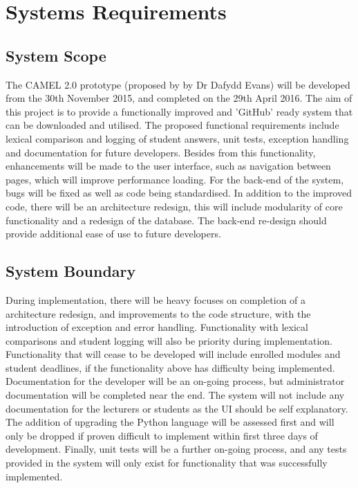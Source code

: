 \section{Systems Requirements}
    \subsection*{System Scope}
	The CAMEL 2.0 prototype (proposed by by Dr Dafydd Evans) will be developed from the 30th November 2015, and completed on the 29th April 2016. The aim of this project is to provide a functionally improved and 'GitHub' ready system that can be downloaded and utilised. The proposed functional requirements include lexical comparison and logging of student answers, unit tests, exception handling and documentation for future developers. Besides from this functionality, enhancements will be made to the user interface, such as navigation between pages, which will improve performance loading. For the back-end of the system, bugs will be fixed as well as code being standardised. In addition to the improved code, there will be an architecture redesign, this will include modularity of core functionality and a redesign of the database. The back-end re-design should provide additional ease of use to future developers.      
	\subsection*{System Boundary}
	During implementation, there will be heavy focuses on completion of a architecture redesign, and improvements to the code structure, with the introduction of exception and error handling. Functionality with lexical comparisons and student logging will also be priority during implementation. Functionality that will cease to be developed will include enrolled modules and student deadlines, if the functionality above has difficulty being implemented. Documentation for the developer will be an on-going process, but administrator documentation will be completed near the end. The system will not include any documentation for the lecturers or students as the UI should be self explanatory. The addition of upgrading the Python language will be assessed first and will only be dropped if proven difficult to implement within first three days of development. Finally, unit tests will be a further on-going process, and any tests provided in the system will only exist for functionality that was successfully implemented.           
